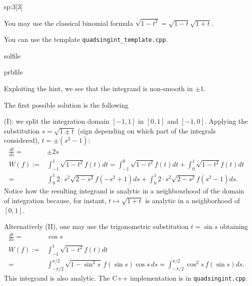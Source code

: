 \begin{samproblem}
\begin{subproblem}{sp:3}[3]
 \begin{samhint}
   You may use the classical binomial formula
   $\sqrt{1 - t^2} = \sqrt{1 - t} \sqrt{1 + t}$.
 \end{samhint}
 
 \begin{samhint}
  You can use the template \verb|quadsingint_template.cpp|.
 \end{samhint}

  \begin{samwriteprbpart}{solfile}
    \begin{writeverbatim}{prbfile}
      \begin{samsolution}
        Exploiting the hint, we see that the integrand is non-smooth in $\pm 1$. 
   
        The first possible solution is the following 

        (I): we split the integration domain $[-1,1]$ in $[0,1]$ and $[-1,0]$. 
             Applying the substitution $s = \sqrt{1 \pm t}$ (sign depending on which part of the integrals considered), $t = \pm(s^2 - 1)$:
        \begin{align*}
          \frac{dt}{ds} =& \pm2s \\
          W(f) :=& \int_{-1}^1 \sqrt{1 - t^2} f(t) dt = \int_{-1}^0 \sqrt{1 - t^2} f(t) dt + \int_0^1 \sqrt{1 - t^2} f(t) dt \\
          =& \int_0^{1} 2 \cdot s^2 \sqrt{2 - s^2} f(-s^2+1) ds + \int_0^{1} 2 \cdot s^2 \sqrt{2 - s^2} f(s^2-1) ds.
        \end{align*}
        Notice how the resulting integrand is analytic in a neighbourhood of the domain
        of integration because, for instant, {$t\mapsto \sqrt{1+t}$} is analytic in a neighborhood of $[0,1]$. 
   
        Alternatively (II), one may use the trigonometric substitution $t = \sin s$ obtaining
        \begin{align*}
          \frac{dt}{ds} =& \cos s \\
          W(f) :=& \int_{-1}^1 \sqrt{1 - t^2} f(t) dt \\
          =& \int_{-\pi / 2}^{\pi / 2} \sqrt{1 - \sin^2\! s}\, f(\sin s) \cos s\,ds = \int_{-\pi / 2}^{\pi / 2} \cos^2\! s \, f(\sin s) ds.
        \end{align*}
        This integrand is also analytic.
        The C++ implementation is in \verb|quadsingint.cpp|.
      \end{samsolution}
    \end{writeverbatim}
  \end{samwriteprbpart}


\end{subproblem}
\end{samproblem}
